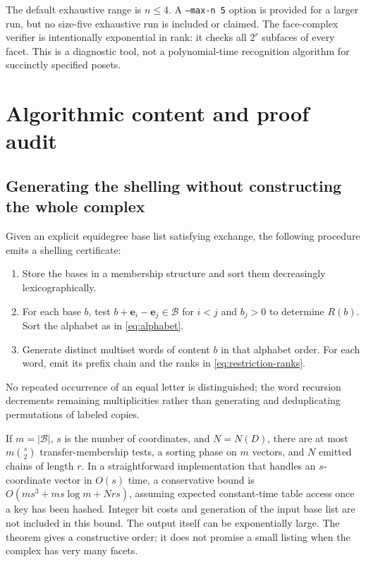 \documentclass[11pt]{article}
\numberwithin{equation}{section}
\theoremstyle{definition}
\theoremstyle{remark}
\newcommand{\ee}{\mathbf e}
\newcommand{\B}{\mathcal B}
\begin{document}
The default exhaustive range is $n\le4$. A \texttt{--max-n 5} option is
provided for a larger run, but no size-five exhaustive run is included or
claimed. The face-complex verifier is intentionally exponential in rank: it
checks all $2^r$ subfaces of every facet. This is a diagnostic tool, not a
polynomial-time recognition algorithm for succinctly specified posets.

\section{Algorithmic content and proof audit}
\label{sec:audit}

\subsection{Generating the shelling without constructing the whole complex}

Given an explicit equidegree base list satisfying exchange, the following
procedure emits a shelling certificate:
\begin{enumerate}
\item Store the bases in a membership structure and sort them decreasingly
lexicographically.
\item For each base $b$, test $b+\ee_i-\ee_j\in\B$ for $i<j$ and $b_j>0$
to determine $R(b)$. Sort the alphabet as in \eqref{eq:alphabet}.
\item Generate distinct multiset words of content $b$ in that alphabet order.
For each word, emit its prefix chain and the ranks in \eqref{eq:restriction-ranks}.
\end{enumerate}
No repeated occurrence of an equal letter is distinguished; the word
recursion decrements remaining multiplicities rather than generating and
deduplicating permutations of labeled copies.

If $m=|\B|$, $s$ is the number of coordinates, and $N=N(D)$, there are at most
$m\binom{s}{2}$ transfer-membership tests, a sorting phase on $m$ vectors,
and $N$ emitted chains of length $r$. In a straightforward implementation
that handles an $s$-coordinate vector in $O(s)$ time, a conservative bound is
$O(ms^3+ms\log m+Nrs)$, assuming expected constant-time table access once a
key has been hashed. Integer bit costs and generation of the input base
list are not included in this bound. The output itself can be exponentially
large. The theorem gives a constructive order; it does not promise a small
listing when the complex has very many facets.
\end{document}

